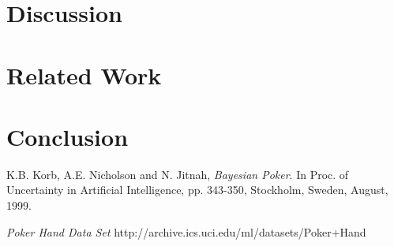 \documentclass[]{article}
\begin{document}
\section{Discussion}
\section{Related Work}

\section{Conclusion}



%
\begin{thebibliography}{9}
K.B. Korb, A.E. Nicholson and N. Jitnah,
 \emph{Bayesian Poker}. 
In Proc. of Uncertainty in Artificial Intelligence, pp. 343-350, 
Stockholm, Sweden, August, 1999.

\emph{Poker Hand Data Set}
http://archive.ics.uci.edu/ml/datasets/Poker+Hand
\end{thebibliography}
\end{document}
